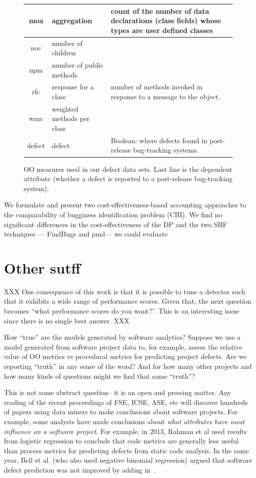 \documentclass{sig-alternative}
\begin{document}
\begin{figure}[!t]
\begin{center}
{\begin{tabular}{c|l|p{4in}}
moa &  aggregation &  count of the number of data declarations (class
fields) whose types are user defined classes\\\hline
noc &  number of children &\\\hline
npm & number of public methods & \\\hline
rfc & response for a class &number of  methods invoked in response to
a message to the object.\\\hline
wmc & weighted methods per class &\\\hline
\rowcolor{lightgray}
defect & defect & Boolean: where defects found in post-release bug-tracking systems.
\end{tabular}
}
\end{center}
\caption{OO measures used in our defect data sets.  Last line is
the dependent attribute (whether a defect is reported to  a
post-release bug-tracking system).}\label{fig:ck}
\end{figure}





We formulate and present two cost-effectiveness-based
accounting approaches to the comparability of bugginess
identification problem (CBI).
We find no significant differences in the cost-effectiveness
of the DP and the two SBF techniques —
FindBugs and pmd— we could evaluate


\section{Other sutff}
XXX One consequence of this work is that it is possible to tune a detector such that it exhibits a wide range of performance scores. Given that, the next question becomes ``what performance scores do you want?''. This is an interesting issue since there is no single best answer. XXX

How ``true'' are the  models generated by software analytics?
Suppose we use a model generated from software project data to, for example,
assess the relative value of OO metrics vs procedural metrics for predicting
project defects. Are we reporting ``truth'' in any sense of the word? And for how
many other projects  and how many kinds of questions might we find that same ``truth''? 

This is not some abstract question-- it is an open and pressing matter.
Any reading of the recent proceedings of FSE, ICSE, ASE, etc will discover hundreds
of papers using data miners to make conclusions about software projects. 
For example, some  analysts have made conclusions
about 
{\em what attributes
have most influence on a software project}.
For example, in 2013,
Rahman et al
\cite{rahman2013how}  used results from logistic regression to conclude
that code metrics are generally less useful than process
metrics for  predicting defects from static code analysis.  
In the same year, Bell et al. (who also used negative binomial regression) argued that
software defect prediction was not improved by adding in~\cite{bell2013limited}.
\end{document}
